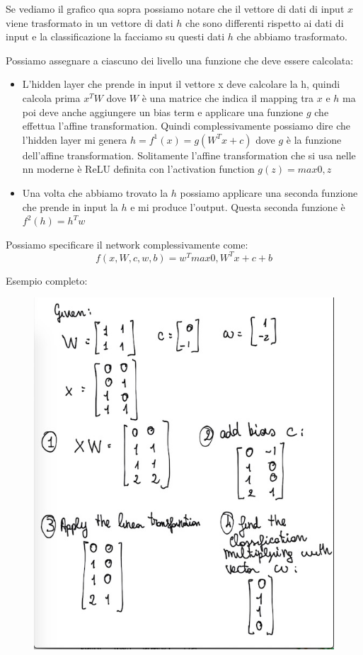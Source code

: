 \documentclass[14pt]{extreport}
\begin{document}
Se vediamo il grafico qua sopra possiamo notare che il vettore di dati di input $x$ viene trasformato in un vettore di dati $h$ che sono differenti
rispetto ai dati di input e la classificazione la facciamo su questi dati $h$ che abbiamo trasformato.

Possiamo assegnare a ciascuno dei livello una funzione che deve essere calcolata:
\begin{itemize}
\item L'hidden layer che prende in input il vettore x deve calcolare la h, quindi calcola prima $x^TW$ dove $W$ è una matrice che indica il mapping
tra $x$ e $h$ ma poi deve anche aggiungere un bias term e applicare una funzione $g$ che effettua l'affine transformation. Quindi complessivamente
possiamo dire che l'hidden layer mi genera $h = f^1(x) = g(W^Tx+c)$ dove $g$ è la funzione dell'affine transformation. Solitamente l'affine
transformation che si usa nelle nn moderne è ReLU definita con l'activation function $g(z) = max{0,z}$
\item Una volta che abbiamo trovato la $h$ possiamo applicare una seconda funzione che prende in input la $h$ e mi produce l'output. Questa seconda
funzione è $f^2(h)=h^Tw$
\end{itemize}


Possiamo specificare il network complessivamente come: $$f(x, W, c, w, b) = w^T max{0, W^Tx+c}+b$$

Esempio completo:

\begin{figure}[H]
\centering
\includegraphics[width=0.7\linewidth]{357.jpeg}
\end{figure}
\end{document}
